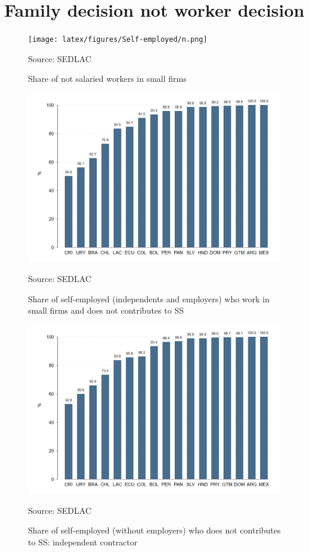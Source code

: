 \documentclass[english]{article}
\begin{document}
\section{Family decision not worker decision}

\begin{figure}[H]
            \justifying
                \caption{Share of not salaried workers in small firms}  
            \centerline{\texttt{[image: latex/figures/Self-employed/n.png]}}
                \label{fig:owner-}
                \footnotesize{Source: SEDLAC}
\end{figure}

\begin{figure}[H]
            \justifying
                \caption{Share of self-employed (independents and employers) who work in small firms and does not contributes to SS}  
            \centerline{\includegraphics[scale=.3]{latex/figures/Self-employed/i_selfsmall.png}}
                \label{fig:owner-}
                \footnotesize{Source: SEDLAC}
\end{figure}

\begin{figure}[H]
            \justifying
                \caption{Share of self-employed (without employers) who does not contributes to SS: independent contractor}  
            \centerline{\includegraphics[scale=.3]{latex/figures/Self-employed/i_independent.png}}
                \label{fig:owner-}
                \footnotesize{Source: SEDLAC}
\end{figure}
\end{document}
